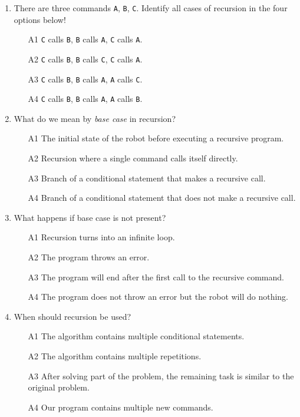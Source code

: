 \begin{enumerate}
\item There are three commands {\tt A}, {\tt B}, {\tt C}. Identify all cases of recursion in the four options below!
\begin{enumerate}
\item[A1] {\tt C} calls {\tt B}, {\tt B} calls {\tt A}, {\tt C} calls {\tt A}.
\item[A2] {\tt C} calls {\tt B}, {\tt B} calls {\tt C}, {\tt C} calls {\tt A}.
\item[A3] {\tt C} calls {\tt B}, {\tt B} calls {\tt A}, {\tt A} calls {\tt C}.
\item[A4] {\tt C} calls {\tt B}, {\tt B} calls {\tt A}, {\tt A} calls {\tt B}.
\end{enumerate}
\item What do we mean by {\em base case} in recursion?
\begin{enumerate}
\item[A1] The initial state of the robot before executing a recursive program.
\item[A2] Recursion where a single command calls itself directly.
\item[A3] Branch of a conditional statement that makes a recursive call.
\item[A4] Branch of a conditional statement that does not make a recursive call.
\end{enumerate}
\item What happens if base case is not present?
\begin{enumerate}
\item[A1] Recursion turns into an infinite loop.
\item[A2] The program throws an error.
\item[A3] The program will end after the first call to the recursive command.
\item[A4] The program does not throw an error but the robot will do nothing.
\end{enumerate}
\item When should recursion be used?
\begin{enumerate}
\item[A1] The algorithm contains multiple conditional statements.
\item[A2] The algorithm contains multiple repetitions.
\item[A3] After solving part of the problem, the remaining task is similar to the original problem.
\item[A4] Our program contains multiple new commands.

\end{enumerate}
\end{enumerate}
